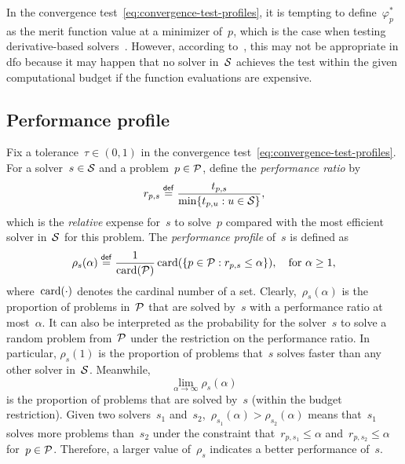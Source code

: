 In the convergence test~\cref{eq:convergence-test-profiles}, it is tempting to define~$\varphi_p^{\ast}$ as the merit function value at a minimizer of~$p$, which is the case when testing derivative-based solvers~\cite{Dolan_More_2002}.
However, according to~\cite{More_Wild_2009}, this may not be appropriate in \gls{dfo} because it may happen that no solver in~$\mathcal{S}$ achieves the test within the given computational budget if the function evaluations are expensive.

\subsection{Performance profile}

Fix a tolerance~$\tau \in (0, 1)$ in the convergence test~\cref{eq:convergence-test-profiles}.
For a solver~$s \in \mathcal{S}$ and a problem~$p \in \mathcal{P}$, define the \emph{performance ratio} by
\begin{equation}
    \label{eq:performance-ratio}
    r_{p, s} \mathrel{\stackrel{\mathsf{def}}{=}} \frac{t_{p, s}}{\min \{t_{p, u} : u \in \mathcal{S}\}},
\end{equation}
which is the \emph{relative} expense for~$s$ to solve~$p$ compared with the most efficient solver in~$\mathcal{S}$ for this problem.
The \emph{performance profile} of~$s$ is defined as
\begin{equation*}
    \rho_s(\alpha) \mathrel{\stackrel{\mathsf{def}}{=}} \frac{1}{\operatorname{card}(\mathcal{P})} \operatorname{card} (\{p \in \mathcal{P} : r_{p, s} \le \alpha\}), \quad \text{for~$\alpha \ge 1$},
\end{equation*}
where~$\operatorname{card}(\cdot)$ denotes the cardinal number of a set.
Clearly,~$\rho_s(\alpha)$ is the proportion of problems in~$\mathcal{P}$ that are solved by~$s$ with a performance ratio at most~$\alpha$.
It can also be interpreted as the probability for the solver~$s$ to solve a random problem from~$\mathcal{P}$ under the restriction on the performance ratio.
In particular, $\rho_s(1)$ is the proportion of problems that~$s$ solves faster than any other solver in~$\mathcal{S}$.
Meanwhile,
\begin{equation*}
    \lim_{\alpha \to \infty} \rho_s(\alpha)
\end{equation*}
is the proportion of problems that are solved by~$s$ (within the budget restriction).
Given two solvers~$s_1$ and~$s_2$,~$\rho_{s_1}(\alpha) > \rho_{s_2}(\alpha)$ means that~$s_1$ solves more problems than~$s_2$ under the constraint that~$r_{p, s_1} \le \alpha$ and~$r_{p, s_2} \le \alpha$ for~$p \in \mathcal{P}$.
Therefore, a larger value of~$\rho_s$ indicates a better performance of~$s$.


